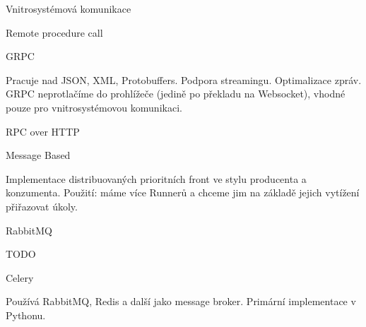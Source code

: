 \sec Vnitrosystémová komunikace

\secc Remote procedure call

\seccc GRPC

Pracuje nad JSON, XML, Protobuffers.
Podpora streamingu.
Optimalizace zpráv.
GRPC neprotlačíme do prohlížeče (jedině po překladu na Websocket), vhodné pouze pro vnitrosystémovou komunikaci.


\seccc RPC over HTTP


\secc Message Based

Implementace distribuovaných prioritních front ve stylu producenta a konzumenta.
Použití: máme více Runnerů a chceme jim na základě jejich vytížení přiřazovat úkoly.

\seccc RabbitMQ

TODO

\secc Celery

Používá RabbitMQ, Redis a další jako message broker. 
Primární implementace v Pythonu.